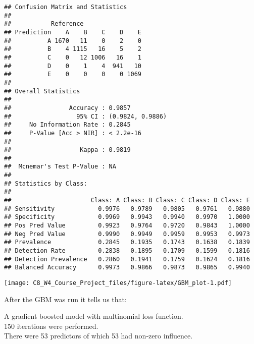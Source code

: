 \documentclass[]{article}
\newenvironment{Shaded}{\begin{snugshade}}{\end{snugshade}}
\newcommand{\KeywordTok}[1]{\textcolor[rgb]{0.13,0.29,0.53}{\textbf{#1}}}
\newcommand{\DataTypeTok}[1]{\textcolor[rgb]{0.13,0.29,0.53}{#1}}
\newcommand{\DecValTok}[1]{\textcolor[rgb]{0.00,0.00,0.81}{#1}}
\newcommand{\StringTok}[1]{\textcolor[rgb]{0.31,0.60,0.02}{#1}}
\newcommand{\CommentTok}[1]{\textcolor[rgb]{0.56,0.35,0.01}{\textit{#1}}}
\newcommand{\OperatorTok}[1]{\textcolor[rgb]{0.81,0.36,0.00}{\textbf{#1}}}
\newcommand{\NormalTok}[1]{#1}
\begin{document}
\begin{verbatim}
## Confusion Matrix and Statistics
## 
##           Reference
## Prediction    A    B    C    D    E
##          A 1670   11    0    2    0
##          B    4 1115   16    5    2
##          C    0   12 1006   16    1
##          D    0    1    4  941   10
##          E    0    0    0    0 1069
## 
## Overall Statistics
##                                           
##                Accuracy : 0.9857          
##                  95% CI : (0.9824, 0.9886)
##     No Information Rate : 0.2845          
##     P-Value [Acc > NIR] : < 2.2e-16       
##                                           
##                   Kappa : 0.9819          
##                                           
##  Mcnemar's Test P-Value : NA              
## 
## Statistics by Class:
## 
##                      Class: A Class: B Class: C Class: D Class: E
## Sensitivity            0.9976   0.9789   0.9805   0.9761   0.9880
## Specificity            0.9969   0.9943   0.9940   0.9970   1.0000
## Pos Pred Value         0.9923   0.9764   0.9720   0.9843   1.0000
## Neg Pred Value         0.9990   0.9949   0.9959   0.9953   0.9973
## Prevalence             0.2845   0.1935   0.1743   0.1638   0.1839
## Detection Rate         0.2838   0.1895   0.1709   0.1599   0.1816
## Detection Prevalence   0.2860   0.1941   0.1759   0.1624   0.1816
## Balanced Accuracy      0.9973   0.9866   0.9873   0.9865   0.9940
\end{verbatim}

\begin{Shaded}
\end{Shaded}

\texttt{[image: C8\_W4\_Course\_Project\_files/figure-latex/GBM\_plot-1.pdf]}

After the GBM was run it tells us that:

A gradient boosted model with multinomial loss function.\\
150 iterations were performed.\\
There were 53 predictors of which 53 had non-zero influence.
\end{document}
